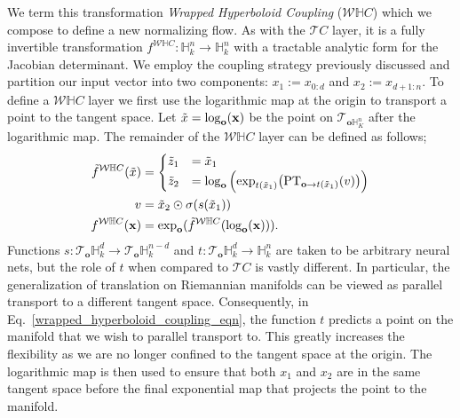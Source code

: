 We term this transformation {\em Wrapped Hyperboloid Coupling} ($\mathcal{W}\mathbb{H}C$) which we compose to define a new normalizing flow.
As with the $\mathcal{T}C$ layer, it is a fully invertible transformation $f^{\mathcal{W}\mathbb{H}C}: \mathbb{H}^n_k \to \mathbb{H}^n_k$ with a tractable analytic form for the Jacobian determinant. 
We employ the coupling strategy previously discussed and partition our input vector into two components: $x_1:=x_{0:d}$ and $x_2:=x_{d+1:n}$.
To define a $\mathcal{W}\mathbb{H}C$ layer we first use the logarithmic map at the origin to transport a point to the tangent space. Let $\tilde{x} = \log_{\textbf{o}}(\mathbf{x})$ be the point on $\mathcal{T}_{\textbf{o}\mathbb{H}^n_K}$ after the logarithmic map. 
The remainder of the $\mathcal{W}\mathbb{H}C$ layer can be defined as follows;
\begin{align}
\label{wrapped_hyperboloid_coupling_eqn}
\tilde{f}^{\mathcal{W}\mathbb{H}C}(\tilde{x})&=
     \begin{cases}
     \tilde{z}_{1} &= \tilde{x}_{1}  \\
     \tilde{z}_{2} &= \log_{\textbf{o}}\Big( \textnormal{exp}_{t(\tilde{x}_{1})}\big(\textnormal{PT}_{\textbf{o}\to t(\tilde{x}_{1}) }(v)\big)\Big) \nonumber
    \end{cases}\\
    v &= \tilde{x}_{2} \odot \sigma(s(\tilde{x}_{1})) \nonumber \\
    f^{\mathcal{W}\mathbb{H}C}(\mathbf{x}) &=  \textnormal{exp}_{\textbf{o}}(\tilde{f}^{\mathcal{W}\mathbb{H}C}(\log_{\textbf{o}}(\mathbf{x}))).
\end{align}
Functions $s: \mathcal{T}_{\textbf{o}}\mathbb{H}^{d}_k \to \mathcal{T}_{\textbf{o}}\mathbb{H}^{n-d}_k$ and $t:\mathcal{T}_{\textbf{o}}\mathbb{H}^{d}_k \to \mathbb{H}^n_k$ are taken to be arbitrary neural nets, but the role of $t$ when compared to $\mathcal{T}C$ is vastly different. In particular, the generalization of translation on Riemannian manifolds can be viewed as parallel transport to a different tangent space. Consequently, in Eq.~\ref{wrapped_hyperboloid_coupling_eqn}, the function $t$ predicts a point on the manifold that we wish to parallel transport to.
This greatly increases the flexibility as we are no longer confined to the tangent space at the origin. The logarithmic map is then used to ensure that both $x_1$ and $x_2$ are in the same tangent space before the final exponential map that projects the point to the manifold.

